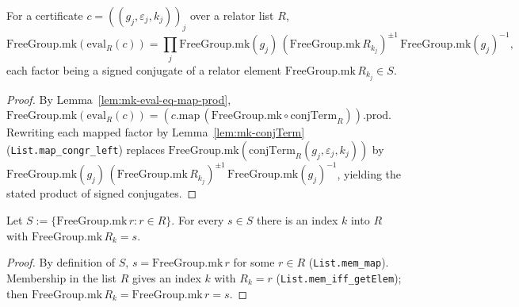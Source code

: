 \begin{lemma}
    \label{lem:mk-eval-eq-prod}
    \leanok
    For a certificate $c = ((g_j, \varepsilon_j, k_j))_j$ over a relator list $R$,
    \[
        \mathrm{FreeGroup.mk}(\mathrm{eval}_R(c)) =
        \prod_j \mathrm{FreeGroup.mk}(g_j)\,
            (\mathrm{FreeGroup.mk}\,R_{k_j})^{\pm 1}\,
            \mathrm{FreeGroup.mk}(g_j)^{-1},
    \]
    each factor being a signed conjugate of a relator element
    $\mathrm{FreeGroup.mk}\,R_{k_j} \in S$.
\end{lemma}
\begin{proof}
    By Lemma~\ref{lem:mk-eval-eq-map-prod},
    $\mathrm{FreeGroup.mk}(\mathrm{eval}_R(c)) =
    (c.\mathrm{map}\,(\mathrm{FreeGroup.mk} \circ \mathrm{conjTerm}_R)).\mathrm{prod}$.
    Rewriting each mapped factor by Lemma~\ref{lem:mk-conjTerm}
    (\texttt{List.map\_congr\_left}) replaces
    $\mathrm{FreeGroup.mk}(\mathrm{conjTerm}_R(g_j,\varepsilon_j,k_j))$ by
    $\mathrm{FreeGroup.mk}(g_j)\,(\mathrm{FreeGroup.mk}\,R_{k_j})^{\pm 1}\,
    \mathrm{FreeGroup.mk}(g_j)^{-1}$, yielding the stated product of signed
    conjugates.
\end{proof}

\begin{lemma}
    \label{lem:relator-index}
    \leanok
    Let $S := \{\mathrm{FreeGroup.mk}\,r : r \in R\}$. For every $s \in S$ there is
    an index $k$ into $R$ with $\mathrm{FreeGroup.mk}\,R_k = s$.
\end{lemma}
\begin{proof}
    By definition of $S$, $s = \mathrm{FreeGroup.mk}\,r$ for some $r \in R$
    (\texttt{List.mem\_map}). Membership in the list $R$ gives an index $k$ with
    $R_k = r$ (\texttt{List.mem\_iff\_getElem}); then
    $\mathrm{FreeGroup.mk}\,R_k = \mathrm{FreeGroup.mk}\,r = s$.
\end{proof}

